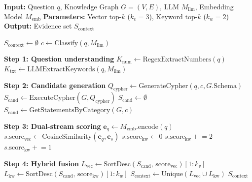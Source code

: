 \documentclass[sn-mathphys, oneside]{sn-jnl}
\begin{document}
\begin{algorithm}[!th]
\caption{Hybrid Graph-Based ESG Retrieval Strategy}
\label{alg:hybrid_retrieval}
\begin{algorithmic}[1]
    \Statex \textbf{Input:} Question $q$, Knowledge Graph $G=(V,E)$,
            LLM $M_{\text{llm}}$, Embedding Model $M_{\text{emb}}$
    \Statex \textbf{Parameters:} Vector top-$k$ ($k_v=3$), Keyword top-$k$ ($k_w=2$)
    \Statex \textbf{Output:} Evidence set $S_{\text{context}}$

    \State $S_{\text{context}} \leftarrow \emptyset$
    \State $c \leftarrow \text{Classify}(q, M_{\text{llm}})$

    \Statex \textbf{Step 1: Question understanding}
    \State $K_{\text{num}} \leftarrow \text{RegexExtractNumbers}(q)$
    \State $K_{\text{txt}} \leftarrow \text{LLMExtractKeywords}(q, M_{\text{llm}})$

    \Statex \textbf{Step 2: Candidate generation}
    \State $Q_{\text{cypher}} \leftarrow \text{GenerateCypher}(q, c, G.\text{Schema})$
        \State $S_{\text{cand}} \leftarrow \text{ExecuteCypher}(G, Q_{\text{cypher}})$
    \Else
        \State $S_{\text{cand}} \leftarrow \emptyset$
    \EndIf
        \State $S_{\text{cand}} \leftarrow \text{GetStatementsByCategory}(G, c)$
    \EndIf

    \Statex \textbf{Step 3: Dual-stream scoring}
    \State $\mathbf{e}_q \leftarrow M_{\text{emb}}.\text{encode}(q)$
        \State $s.\text{score}_{\text{vec}} \leftarrow
               \text{CosineSimilarity}(\mathbf{e}_q, \mathbf{e}_s)$
        \State $s.\text{score}_{\text{kw}} \leftarrow 0$
                \State $s.\text{score}_{\text{kw}} \mathrel{+}= 2$
            \EndIf
        \EndFor
                \State $s.\text{score}_{\text{kw}} \mathrel{+}= 1$
            \EndIf
        \EndFor
    \EndFor

    \Statex \textbf{Step 4: Hybrid fusion}
    \State $L_{\text{vec}} \leftarrow
           \text{SortDesc}(S_{\text{cand}},\, \text{score}_{\text{vec}})[1{:}k_v]$
    \State $L_{\text{kw}}  \leftarrow
           \text{SortDesc}(S_{\text{cand}},\, \text{score}_{\text{kw}})[1{:}k_w]$
    \State $S_{\text{context}} \leftarrow
           \text{Unique}(L_{\text{vec}} \cup L_{\text{kw}})$
    \State \Return $S_{\text{context}}$
\end{algorithmic}
\end{algorithm}
\end{document}
